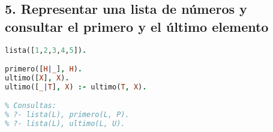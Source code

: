 \documentclass[12pt]{article}
\begin{document}
\subsection*{5. Representar una lista de números y consultar el primero y el último elemento}
\begin{lstlisting}[language=Prolog]
lista([1,2,3,4,5]).

primero([H|_], H).
ultimo([X], X).
ultimo([_|T], X) :- ultimo(T, X).

% Consultas:
% ?- lista(L), primero(L, P).
% ?- lista(L), ultimo(L, U).
\end{lstlisting}
\end{document}
